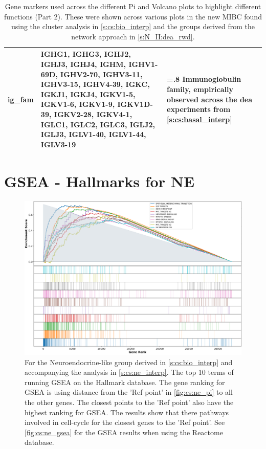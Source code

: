 \begin{table}[H]
\begin{tabularx}{\textwidth}{>{\hsize=0.6\hsize}X|>{\hsize=1.6\hsize}X|>{\hsize=.8\hsize}X}
        \midrule
        \textbf{ig\_fam} & IGHG1, IGHG3, IGHJ2, IGHJ3, IGHJ4, IGHM, IGHV1-69D, IGHV2-70, IGHV3-11, IGHV3-15, IGHV4-39, IGKC, IGKJ1, IGKJ4, IGKV1-5, IGKV1-6, IGKV1-9, IGKV1D-39, IGKV2-28, IGKV4-1, IGLC1, IGLC2, IGLC3, IGLJ2, IGLJ3, IGLV1-40, IGLV1-44, IGLV3-19 & Immunoglobulin family, empirically observed across the \acrlong{dea} experiments from \cref{s:cs:basal_interp} \\
        \bottomrule
    \end{tabularx}
    \caption[Gene markers used in pi-plots - part 2]{Gene markers used across the different Pi and Volcano plots to highlight different functions (Part 2). These were shown across various plots in the new MIBC found using the cluster analysis in \cref{s:cs:bio_interp} and the groups derived from the network approach in \cref{s:N_II:dea_rwd}.}
    \label{tab:ap:pi_genes_2}
\end{table}


\section{GSEA - Hallmarks for NE} \label{s:ap:cs:gsea_ne}

\begin{figure}[H]    
    \centering
\includegraphics[width=1.0\textwidth,keepaspectratio]{Sections/ClusteringAnalysis/Resources/discussion/other_groups/ne2_hallmark_10_top.png}
     \caption[GSEA markers for Ne-like group]{For the Neuroendocrine-like group derived in \cref{s:cs:bio_interp} and accompanying the analysis in \cref{s:cs:ne_interp}. The top 10 terms of running GSEA on the Hallmark database. The gene ranking for GSEA is using distance from the 'Ref point' in \cref{fig:cs:ne_pi} to all the other genes. The closest points to the 'Ref point' also have the highest ranking for GSEA. The results show that there pathways involved in cell-cycle for the closest genes to the 'Ref point'. See \cref{fig:cs:ne_gsea} for the GSEA results when using the Reactome database. }
    \label{fig:ap:cs:gsea_ne_hallmark}
\end{figure}


